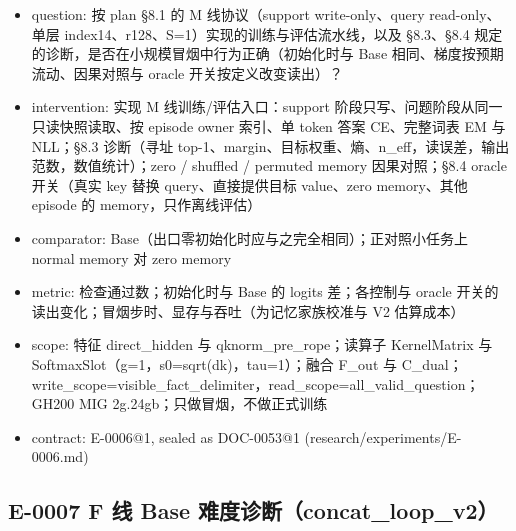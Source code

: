 \documentclass[11pt]{article}
\begin{document}
\begin{itemize}
\item question: 按 plan §8.1 的 M 线协议（support write-only、query read-only、单层 index14、r128、S=1）实现的训练与评估流水线，以及 §8.3、§8.4 规定的诊断，是否在小规模冒烟中行为正确（初始化时与 Base 相同、梯度按预期流动、因果对照与 oracle 开关按定义改变读出）？
\item intervention: 实现 M 线训练/评估入口：support 阶段只写、问题阶段从同一只读快照读取、按 episode owner 索引、单 token 答案 CE、完整词表 EM 与 NLL；§8.3 诊断（寻址 top-1、margin、目标权重、熵、n\_eff，读误差，输出范数，数值统计）；zero / shuffled / permuted memory 因果对照；§8.4 oracle 开关（真实 key 替换 query、直接提供目标 value、zero memory、其他 episode 的 memory，只作离线评估）
\item comparator: Base（出口零初始化时应与之完全相同）；正对照小任务上 normal memory 对 zero memory
\item metric: 检查通过数；初始化时与 Base 的 logits 差；各控制与 oracle 开关的读出变化；冒烟步时、显存与吞吐（为记忆家族校准与 V2 估算成本）
\item scope: 特征 direct\_hidden 与 qknorm\_pre\_rope；读算子 KernelMatrix 与 SoftmaxSlot（g=1，s0=sqrt(dk)，tau=1）；融合 F\_out 与 C\_dual；write\_scope=visible\_fact\_delimiter，read\_scope=all\_valid\_question；GH200 MIG 2g.24gb；只做冒烟，不做正式训练
\item contract: E-0006@1, sealed as DOC-0053@1 (research/experiments/E-0006.md)
\end{itemize}

\subsection*{E-0007 F 线 Base 难度诊断（concat\_loop\_v2）}
\end{document}
